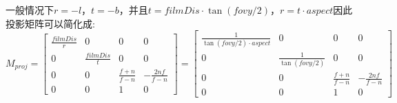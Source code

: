 一般情况下$r = -l$，$t = -b$，并且$t=filmDis \cdot \tan{(fovy/2)}$，$r=t \cdot aspect$因此投影矩阵可以简化成:
\begin{displaymath}
M_{proj} = 
\begin{bmatrix}
\frac{filmDis}{r} & 0 & 0 & 0\\
0 & \frac{filmDis}{t} & 0 & 0\\
0 & 0 & \frac{f + n}{f - n} & -\frac{2nf}{f - n}\\
0 & 0 & 1 & 0
\end{bmatrix} = 
\begin{bmatrix}
\frac{1}{\tan{(fovy/2)} \cdot aspect} & 0 & 0 & 0\\
0 & \frac{1}{\tan{(fovy/2)}} & 0 & 0\\
0 & 0 & \frac{f + n}{f - n} & -\frac{2nf}{f - n}\\
0 & 0 & 1 & 0
\end{bmatrix}
\end{displaymath}